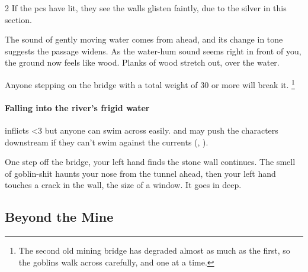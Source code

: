 \begin{multicols}{2}
If the \glspl{pc} have  lit, they see the walls glisten faintly, due to the silver in this section.



\begin{boxtext}
  The sound of gently moving water comes from ahead, and its change in tone suggests the passage widens.
  As the water-hum sound seems right in front of you, the ground now feels like wood.
  Planks of wood stretch out, over the water.
\end{boxtext}

Anyone stepping on the bridge with a total \gls{weight} of 30 or more will break it.%
\footnote{The second old mining bridge has degraded almost as much as the first, so the goblins walk across carefully, and one at a time.}

\paragraph{Falling into the river's frigid water}
inflicts 
\ifnum\value{temperature}<3%
  but anyone can swim across easily.
\else%
  and may push the characters downstream if they can't swim against the currents (, \tn[5]).
\fi%


\begin{boxtext}
  One step off the bridge, your left hand finds the stone wall continues.
  The smell of goblin-shit haunts your nose from the tunnel ahead, then your left hand touches a crack in the wall, the size of a window.
  It goes in deep.
\end{boxtext}

\subsection{Beyond the Mine}



\end{multicols}
